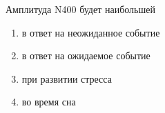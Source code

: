 
Амплитуда N400 будет наибольшей

\begin{enumerate}
    \item в ответ на неожиданное событие
    \item в ответ на ожидаемое событие
    \item при развитии стресса
    \item во время сна
\end{enumerate}